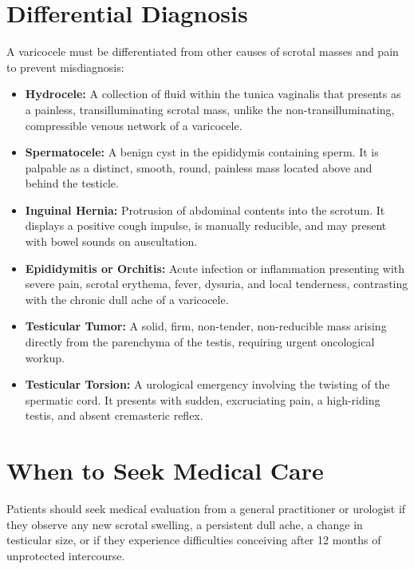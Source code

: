 \section*{Differential Diagnosis}
A varicocele must be differentiated from other causes of scrotal masses and pain to prevent misdiagnosis:
\begin{itemize}
  \item \textbf{Hydrocele:} A collection of fluid within the tunica vaginalis that presents as a painless, transilluminating scrotal mass, unlike the non-transilluminating, compressible venous network of a varicocele.
  \item \textbf{Spermatocele:} A benign cyst in the epididymis containing sperm. It is palpable as a distinct, smooth, round, painless mass located above and behind the testicle.
  \item \textbf{Inguinal Hernia:} Protrusion of abdominal contents into the scrotum. It displays a positive cough impulse, is manually reducible, and may present with bowel sounds on auscultation.
  \item \textbf{Epididymitis or Orchitis:} Acute infection or inflammation presenting with severe pain, scrotal erythema, fever, dysuria, and local tenderness, contrasting with the chronic dull ache of a varicocele.
  \item \textbf{Testicular Tumor:} A solid, firm, non-tender, non-reducible mass arising directly from the parenchyma of the testis, requiring urgent oncological workup.
  \item \textbf{Testicular Torsion:} A urological emergency involving the twisting of the spermatic cord. It presents with sudden, excruciating pain, a high-riding testis, and absent cremasteric reflex.
\end{itemize}

\section*{When to Seek Medical Care}
Patients should seek medical evaluation from a general practitioner or urologist if they observe any new scrotal swelling, a persistent dull ache, a change in testicular size, or if they experience difficulties conceiving after 12 months of unprotected intercourse.

